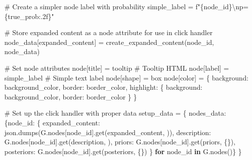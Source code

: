 \documentclass[
  11pt,
  letterpaper,
  openany]{book}
\newenvironment{Shaded}{\begin{snugshade}}{\end{snugshade}}
\newcommand{\CharTok}[1]{\textcolor[rgb]{0.13,0.47,0.30}{#1}}
\newcommand{\CommentTok}[1]{\textcolor[rgb]{0.37,0.37,0.37}{#1}}
\newcommand{\ControlFlowTok}[1]{\textcolor[rgb]{0.00,0.23,0.31}{\textbf{#1}}}
\newcommand{\KeywordTok}[1]{\textcolor[rgb]{0.00,0.23,0.31}{\textbf{#1}}}
\newcommand{\NormalTok}[1]{\textcolor[rgb]{0.00,0.23,0.31}{#1}}
\newcommand{\OperatorTok}[1]{\textcolor[rgb]{0.37,0.37,0.37}{#1}}
\newcommand{\SpecialCharTok}[1]{\textcolor[rgb]{0.37,0.37,0.37}{#1}}
\newcommand{\SpecialStringTok}[1]{\textcolor[rgb]{0.13,0.47,0.30}{#1}}
\newcommand{\StringTok}[1]{\textcolor[rgb]{0.13,0.47,0.30}{#1}}
\begin{document}
\begin{landscape}
\begin{Shaded}
\begin{Highlighting}[]
        \CommentTok{\# Create a simpler node label with probability}
\NormalTok{        simple\_label }\OperatorTok{=} \SpecialStringTok{f"}\SpecialCharTok{\{}\NormalTok{node\_id}\SpecialCharTok{\}}\CharTok{\textbackslash{}n}\SpecialStringTok{p=}\SpecialCharTok{\{}\NormalTok{true\_prob}\SpecialCharTok{:.2f\}}\SpecialStringTok{"}

        \CommentTok{\# Store expanded content as a node attribute for use in click handler}
\NormalTok{        node\_data[}\StringTok{\textquotesingle{}expanded\_content\textquotesingle{}}\NormalTok{] }\OperatorTok{=}\NormalTok{ create\_expanded\_content(node\_id, node\_data)}

        \CommentTok{\# Set node attributes}
\NormalTok{        node[}\StringTok{\textquotesingle{}title\textquotesingle{}}\NormalTok{] }\OperatorTok{=}\NormalTok{ tooltip  }\CommentTok{\# Tooltip HTML}
\NormalTok{        node[}\StringTok{\textquotesingle{}label\textquotesingle{}}\NormalTok{] }\OperatorTok{=}\NormalTok{ simple\_label  }\CommentTok{\# Simple text label}
\NormalTok{        node[}\StringTok{\textquotesingle{}shape\textquotesingle{}}\NormalTok{] }\OperatorTok{=} \StringTok{\textquotesingle{}box\textquotesingle{}}
\NormalTok{        node[}\StringTok{\textquotesingle{}color\textquotesingle{}}\NormalTok{] }\OperatorTok{=}\NormalTok{ \{}
            \StringTok{\textquotesingle{}background\textquotesingle{}}\NormalTok{: background\_color,}
            \StringTok{\textquotesingle{}border\textquotesingle{}}\NormalTok{: border\_color,}
            \StringTok{\textquotesingle{}highlight\textquotesingle{}}\NormalTok{: \{}
                \StringTok{\textquotesingle{}background\textquotesingle{}}\NormalTok{: background\_color,}
                \StringTok{\textquotesingle{}border\textquotesingle{}}\NormalTok{: border\_color}
\NormalTok{            \}}
\NormalTok{        \}}

    \CommentTok{\# Set up the click handler with proper data}
\NormalTok{    setup\_data }\OperatorTok{=}\NormalTok{ \{}
        \StringTok{\textquotesingle{}nodes\_data\textquotesingle{}}\NormalTok{: \{node\_id: \{}
            \StringTok{\textquotesingle{}expanded\_content\textquotesingle{}}\NormalTok{: json.dumps(G.nodes[node\_id].get(}\StringTok{\textquotesingle{}expanded\_content\textquotesingle{}}\NormalTok{, }\StringTok{\textquotesingle{}\textquotesingle{}}\NormalTok{)),}
            \StringTok{\textquotesingle{}description\textquotesingle{}}\NormalTok{: G.nodes[node\_id].get(}\StringTok{\textquotesingle{}description\textquotesingle{}}\NormalTok{, }\StringTok{\textquotesingle{}\textquotesingle{}}\NormalTok{),}
            \StringTok{\textquotesingle{}priors\textquotesingle{}}\NormalTok{: G.nodes[node\_id].get(}\StringTok{\textquotesingle{}priors\textquotesingle{}}\NormalTok{, \{\}),}
            \StringTok{\textquotesingle{}posteriors\textquotesingle{}}\NormalTok{: G.nodes[node\_id].get(}\StringTok{\textquotesingle{}posteriors\textquotesingle{}}\NormalTok{, \{\})}
\NormalTok{        \} }\ControlFlowTok{for}\NormalTok{ node\_id }\KeywordTok{in}\NormalTok{ G.nodes()\}}
\NormalTok{    \}}


\end{Highlighting}
\end{Shaded}
\end{landscape}
\end{document}
